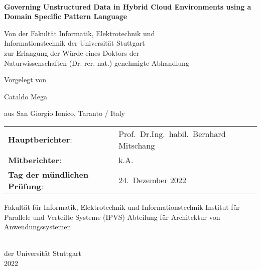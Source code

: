 {\selectfont

\begin{titlepage} %

\begin{center}


{\LARGE \bfseries \textit{ }\\

\textbf{Governing Unstructured Data in Hybrid Cloud Environments using a Domain Specific Pattern Language}\\

}

\vfill


{

{Von der Fakultät Informatik, Elektrotechnik und\\

Informationstechnik der Universität Stuttgart\\

zur Erlangung der Würde eines Doktors der\\

Naturwissenschaften (Dr. rer. nat.) genehmigte Abhandlung

}

\vfill


{

Vorgelegt von\\[5mm]

{\Large

Cataldo Mega\\[5mm]

}

aus San Giorgio Ionico, Taranto / Italy\\[5mm]

}

\vfill


\begin{tabular}{ll}

\textbf{Hauptberichter}: & Prof.\ Dr.\-Ing.\ habil.\ Bernhard Mitschang\\

\textbf{Mitberichter}: & k.A.\\

\textbf{Tag der mündlichen Prüfung}: & 24.\ Dezember 2022

\end{tabular}

\vfill


{

Fakultät für Informatik, Elektrotechnik und Informationstechnik 
Institut für Parallele und Verteilte Systeme (IPVS)
Abteilung für Architektur von Anwendungssystemen}\\
der Universität Stuttgart\\

2022

}

\end{center}

\end{titlepage}

}
\thispagestyle{empty}
\cleardoublepage